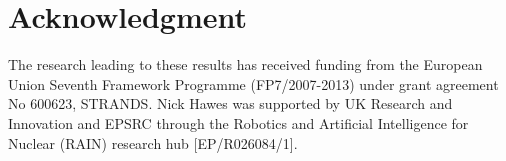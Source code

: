 \section*{Acknowledgment}

The research leading to these results has received funding from the European Union Seventh Framework Programme (FP7/2007-2013) under grant agreement No 600623, STRANDS. Nick Hawes was supported by UK Research and Innovation and EPSRC through the Robotics and Artificial Intelligence for Nuclear (RAIN) research hub [EP/R026084/1].
